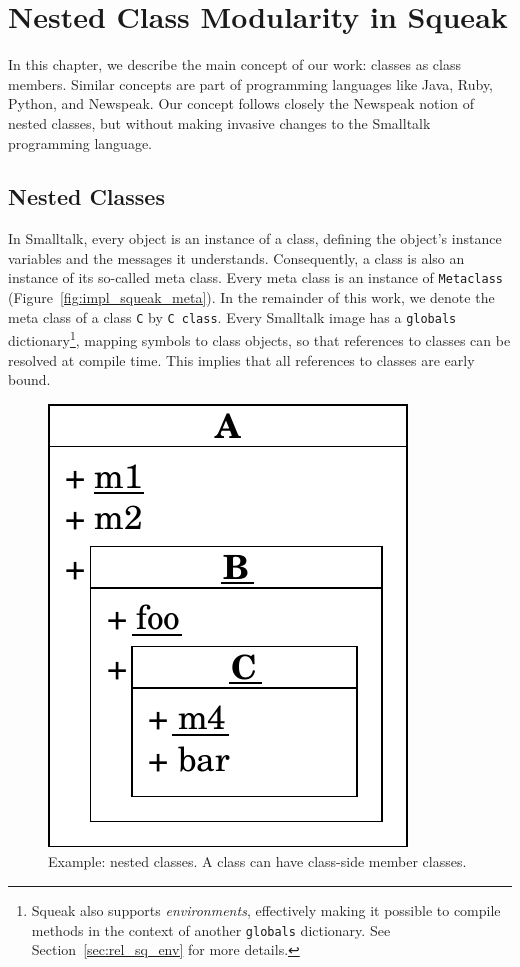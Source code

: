 \chapter{Nested Class Modularity in Squeak}
\label{sec:concept}
In this chapter, we describe the main concept of our work: classes as class members. Similar concepts are part of programming languages like Java, Ruby, Python, and Newspeak. Our concept follows closely the Newspeak notion of nested classes, but without making invasive changes to the Smalltalk programming language.

\section{Nested Classes}
In Smalltalk, every object is an instance of a class, defining the object's instance variables and the messages it understands. Consequently, a class is also an instance of its so-called meta class. Every meta class is an instance of \texttt{Metaclass} (Figure~\ref{fig:impl_squeak_meta}). In the remainder of this work, we denote the meta class of a class \texttt{C} by \texttt{C class}. Every Smalltalk image has a \texttt{globals} dictionary\footnote{Squeak also supports \emph{environments}, effectively making it possible to compile methods in the context of another \texttt{globals} dictionary. See Section~\ref{sec:rel_sq_env} for more details.}, mapping symbols to class objects, so that references to classes can be resolved at compile time. This implies that all references to classes are early bound.

\begin{figure}
	\includegraphics[scale=0.75]{nested_notation.pdf}
	\centering
	\caption[Example: Nested classes]{Example: nested classes. A class can have class-side member classes.}
	\label{fig:concept_nested_notation}
\end{figure}

